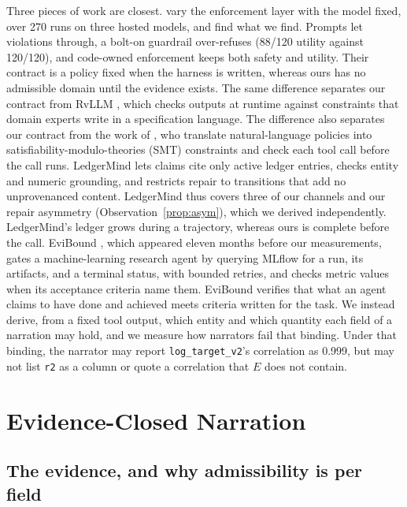 \documentclass[10pt,twocolumn]{article}
\begin{document}
Three pieces of work are closest. \citet{ahn2026harness} vary the
enforcement layer with the model fixed, over 270 runs on three hosted models,
and find what we find. Prompts let violations through, a bolt-on guardrail
over-refuses (88/120 utility against 120/120), and code-owned enforcement keeps
both safety and utility. Their contract is a policy fixed when the harness
is written, whereas ours has no admissible domain until the evidence exists.
The same difference separates our contract from RvLLM \citep{zhang2025rvllm},
which checks outputs at runtime against constraints that domain experts write
in a specification language. The difference also separates our contract from
the work of \citet{winston2026solver}, who translate
natural-language policies into satisfiability-modulo-theories (SMT)
constraints and check each tool call before the call runs. LedgerMind \citep{du2026ledgermind} lets claims cite only
active ledger entries, checks entity and numeric grounding, and restricts
repair to transitions that add no unprovenanced content. LedgerMind thus
covers three of our channels and our repair asymmetry
(Observation~\ref{prop:asym}), which we derived independently. LedgerMind's
ledger grows during a trajectory, whereas ours is complete before the call.
EviBound \citep{chen2025evibound}, which appeared eleven months before our
measurements, gates a machine-learning research agent by querying MLflow for a
run, its artifacts, and a terminal status, with bounded retries, and checks
metric values when its acceptance criteria name them. EviBound verifies that
what an agent claims to have done and achieved meets criteria written for the
task. We instead derive, from a fixed tool output, which entity and which
quantity each field of a narration may hold, and we measure how narrators fail
that binding. Under that binding, the narrator may report
\texttt{log\_target\_v2}'s correlation as 0.999, but may not list \texttt{r2}
as a column or quote a correlation that $E$ does not contain.

\section{Evidence-Closed Narration}\label{sec:theory}

\subsection{The evidence, and why admissibility is per field}
\end{document}

